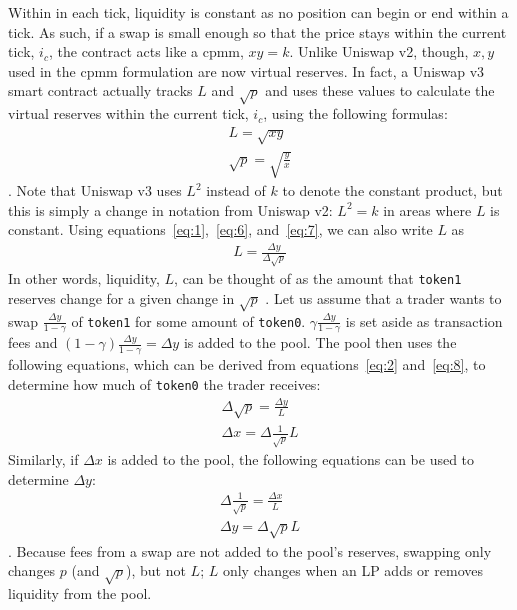 \documentclass[11pt]{article}
\begin{document}
Within in each tick, liquidity is constant as no position can begin or end within a tick. As such, if a swap is small enough so that the price stays within the current tick, $i_c$, the contract acts like a \gls{cpmm}, $xy=k$. Unlike Uniswap v2, though, $x, y$ used in the \gls{cpmm} formulation are now virtual reserves. In fact, a Uniswap v3 smart contract actually tracks $L$ and $\sqrt{p}$ and uses these values to calculate the virtual reserves within the current tick, $i_c$, using the following formulas:
\begin{gather}
    L = \sqrt{xy} \label{eq:6}\\
    \sqrt{p} = \sqrt{\frac{y}{x}}\label{eq:7}
\end{gather}
\citep{Uniswapv3}. Note that Uniswap v3 uses $L^2$ instead of $k$ to denote the constant product, but this is simply a change in notation from Uniswap v2: $L^2 = k$ in areas where $L$ is constant. Using equations~\eqref{eq:1},~\eqref{eq:6}, and~\eqref{eq:7}, we can also write $L$ as
\begin{gather}
    L = \frac{\Delta y}{\Delta \sqrt{p}}\label{eq:8}
\end{gather}
In other words, liquidity, $L$, can be thought of as the amount that \texttt{token1} reserves change for a given change in $\sqrt{p}$ \citep{Uniswapv3}. Let us assume that a trader wants to swap $\frac{\Delta y}{1 - \gamma}$ of \texttt{token1} for some amount of \texttt{token0}. $\gamma \frac{\Delta y}{1 - \gamma}$ is set aside as transaction fees and $(1 - \gamma) \frac{\Delta y}{1 - \gamma} = \Delta y$ is added to the pool. The pool then uses the following equations, which can be derived from equations~\eqref{eq:2} and~\eqref{eq:8}, to determine how much of \texttt{token0} the trader receives:
\begin{gather}
    \Delta \sqrt{p} = \frac{\Delta y}{L} \\
    \Delta x = \Delta \frac{1}{\sqrt{p}} L
\end{gather}
Similarly, if $\Delta x$ is added to the pool, the following equations can be used to determine $\Delta y$:
\begin{gather}
    \Delta \frac{1}{\sqrt{p}} = \frac{\Delta x}{L} \\
    \Delta y = \Delta \sqrt{p} L
\end{gather}
\citep{Uniswapv3}. Because fees from a swap are not added to the pool's reserves, swapping only changes $p$ (and $\sqrt{p}$), but not $L$; $L$ only changes when an LP adds or removes liquidity from the pool.
\end{document}
